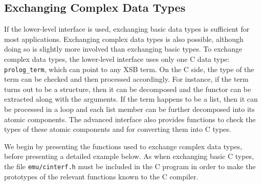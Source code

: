 \subsection{Exchanging Complex Data Types}
\label{c2p_p2p_p2c}

If the lower-level interface is used, exchanging basic data types is
sufficient for most applications.  Exchanging complex data types is
also possible, although doing so is slightly more involved than
exchanging basic types.  To exchange complex data types, the
lower-level interface uses only one C data type: {\tt prolog\_term},
which can point to any XSB term.  On the C side, the type of the term
can be checked and then processed accordingly.  For instance, if the
term turns out to be a structure, then it can be decomposed and the
functor can be extracted along with the arguments.  If the term
happens to be a list, then it can be processed in a loop and each list
member can be further decomposed into its atomic components.  The
advanced interface also provides functions to check the types of these
atomic components and for converting them into C types.

We begin by presenting the functions used to exchange complex data
types, before presenting a detailed example below.  As when exchanging
basic C types, the file {\tt emu/cinterf.h} must be included in the C
program in order to make the prototypes of the relevant functions
known to the C compiler.

